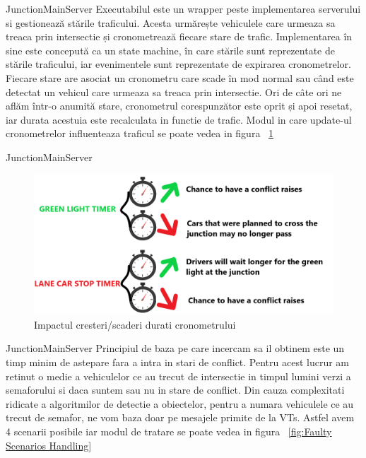 \documentclass{beamer}
\begin{document}
    \begin{frame}{JunctionMainServer}
        Executabilul este un wrapper peste implementarea serverului si 
        gestionează stările traficului. Acesta urmărește vehiculele
        care urmeaza sa treaca prin intersectie și cronometrează fiecare stare de trafic.
        Implementarea în sine este concepută ca un state machine, 
        în care stările sunt reprezentate de stările traficului,
        iar evenimentele sunt reprezentate de expirarea cronometrelor.
        Fiecare stare are asociat un cronometru care scade în mod
        normal sau când este detectat un vehicul care urmeaza sa treaca
        prin intersectie. Ori de câte ori ne aflăm într-o anumită stare,
        cronometrul corespunzător este oprit și apoi resetat, iar 
        durata acestuia este recalculata in functie de trafic.
        Modul in care update-ul cronometrelor influenteaza traficul se
        poate vedea in figura ~\ref{fig:Timer Increase/Decrease Impact}
    \end{frame}

    \begin{frame}{JunctionMainServer}
        \begin{figure}[h!]
            \includegraphics[width=\textwidth]{Sketches/TimerIncreaseDecreaseImpact.png}
            \caption{Impactul cresteri/scaderi durati cronometrului}
            \label{fig:Timer Increase/Decrease Impact}
        \end{figure}
    \end{frame}

    \begin{frame}{JunctionMainServer}
        Principiul de baza pe care incercam sa il obtinem este un timp 
        minim de astepare fara a intra in stari de conflict. Pentru 
        acest lucrur am retinut o medie a vehiculelor ce au trecut 
        de intersectie in timpul lumini verzi a semaforului si daca 
        suntem sau nu in stare de conflict. Din cauza complexitati 
        ridicate a algoritmilor de detectie a obiectelor, pentru a 
        numara vehiculele ce au trecut de semafor, ne vom baza doar 
        pe mesajele primite de la VTs. Astfel avem 4 scenarii 
        posibile iar modul de tratare se poate vedea in figura ~\ref{fig:Faulty Scenarios Handling}
    \end{frame}
\end{document}

